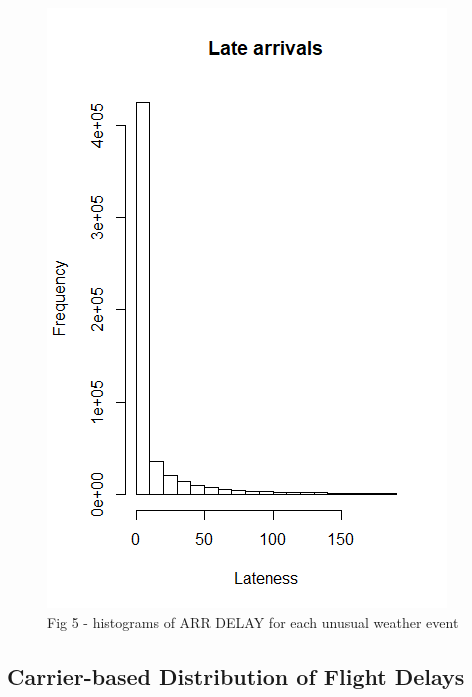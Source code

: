 \documentclass[12pt, a4paper]{book}
\begin{document}
	 		\begin{figure}[h]
	 		\includegraphics[width = .75 \textwidth]{../figures/LateArrivalsHistogram}
	 		\caption{Fig 5 - histograms of ARR DELAY for each unusual weather event}
	 		\end{figure}
		\subsection{Carrier-based Distribution of Flight Delays}
			
\end{document}
